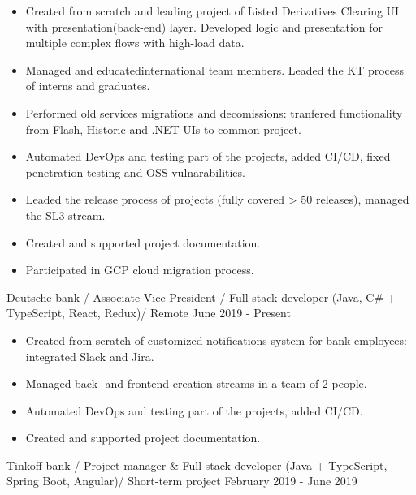 

\vspace{0cm}\begin{cventries}
\cventry
{
\vspace{-0.4cm}
\begin{itemize}
\item Created from scratch and leading project of Listed Derivatives Clearing UI with presentation(back-end) layer. Developed logic and presentation for multiple complex flows with high-load data.
\item Managed and educatedinternational team members. Leaded the KT process of interns and graduates.
\item Performed old services migrations and decomissions: tranfered functionality from Flash, Historic and .NET UIs to common project. 
\item Automated DevOps and testing part of the projects, added CI/CD, fixed penetration testing and OSS vulnarabilities. 
\item Leaded the release process of projects (fully covered > 50 releases), managed the SL3 stream.
\item Created and supported project documentation.
\item Participated in GCP cloud migration process.
\end{itemize}
} %
{Deutsche bank / Associate Vice President / Full-stack developer (Java, C\# + TypeScript, React, Redux)/ Remote} %
{} %
{June 2019 - Present} %
\noindent	

\vspace{-0.4cm}
\cventry
{
\vspace{-0.4cm}
\begin{itemize}
\item Created from scratch of customized notifications system for bank employees: integrated Slack and Jira.
\item Managed back- and frontend creation streams in a team of 2 people.
\item Automated DevOps and testing part of the projects, added CI/CD. 
\item Created and supported project documentation.
\end{itemize}
} %
{Tinkoff bank / Project manager \& Full-stack developer (Java + TypeScript, Spring Boot, Angular)/ Short-term project} %
{} %
{February 2019 - June 2019} %
\noindent	


\end{cventries}
